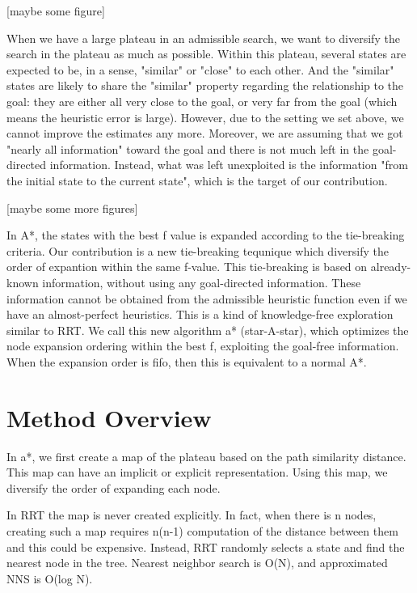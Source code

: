 [maybe some figure]

When we have a large plateau in an admissible search,
we want to diversify the search in the plateau as much as possible.
Within this plateau, several states are expected to be, in a sense,
"similar" or "close" to each other. And the "similar" states are likely to
share the "similar" property regarding the relationship to the goal:
they are either all very close to the goal, or very far from the goal (which means
the heuristic error is large). However, due to the setting we set
above, we cannot improve the estimates any more. Moreover, we are assuming
that we got "nearly all information" toward the goal and there is not much
left in the goal-directed information.
Instead, what was left unexploited is the information "from the initial state to the
current state", which is the target of our contribution.

[maybe some more figures]


In A*, the states with the best f value is expanded according to the
tie-breaking criteria. Our contribution is a new tie-breaking tequnique
which diversify the order of expantion within the same f-value.
This tie-breaking is based on already-known information,
without using any goal-directed information.
These information cannot be obtained from the admissible heuristic function even if we
have an almost-perfect heuristics.
This is a kind of knowledge-free exploration similar to RRT.
We call this new algorithm \*a* (star-A-star), which optimizes the node
expansion ordering within the best f, exploiting the goal-free information.
When the expansion order is fifo, then this is equivalent to a normal A*.
\section{Method Overview}
\label{sec-2}


In \*a*, we first create a map of the plateau based on the path similarity
distance. This map can have an implicit or explicit representation.
Using this map, we diversify the order of expanding each node.

In RRT the map is never created explicitly.
In fact, when there is n nodes, creating such a map requires n(n-1) computation of the distance
between them and this could be expensive. Instead, RRT randomly selects a state
and find the nearest node in the tree. Nearest neighbor search is O(N), and
approximated NNS is O(log N).

